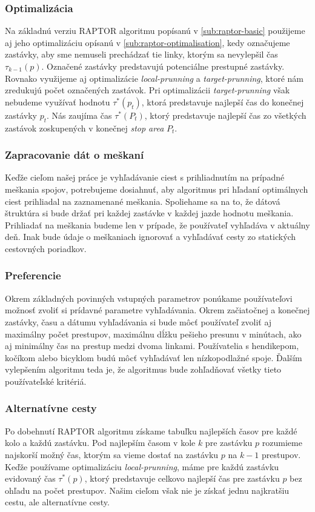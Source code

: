 \subsubsection{Optimalizácia}
Na základnú verziu RAPTOR algoritmu popísanú v \ref{sub:raptor-basic} použijeme aj jeho optimalizáciu opísanú v \ref{sub:raptor-optimalisation}, kedy označujeme zastávky, aby sme nemuseli prechádzať tie linky, ktorým sa nevylepšil čas $\tau_{k-1}(p)$. Označené zastávky predstavujú potenciálne prestupné zastávky.  Rovnako využijeme aj optimalizácie \textit{local-prunning} a \textit{target-prunning}, ktoré nám zredukujú počet označených zastávok. Pri optimalizácii \textit{target-prunning} však nebudeme využívať hodnotu $\tau^*(p_t)$, ktorá predstavuje najlepší čas do konečnej zastávky $p_t$. Nás zaujíma čas $\tau^*(P_t)$, ktorý predstavuje najlepší čas zo všetkých zastávok zoskupených v konečnej \textit{stop area} $P_t$. 

\subsubsection{Zapracovanie dát o meškaní}
Keďže cieľom našej práce je vyhľadávanie ciest s prihliadnutím na prípadné meškania spojov, potrebujeme dosiahnuť, aby algoritmus pri hľadaní optimálnych ciest prihliadal na zaznamenané meškania. Spoliehame sa na to, že dátová štruktúra si bude držať pri každej zastávke v každej jazde hodnotu meškania. Prihliadať na meškania budeme len v prípade, že používateľ vyhľadáva v aktuálny deň. Inak bude údaje o meškaniach ignorovať a vyhľadávať cesty zo statických cestovných poriadkov.

\subsubsection{Preferencie}
Okrem základných povinných vstupných parametrov ponúkame používateľovi možnosť zvoliť si prídavné parametre vyhľadávania. Okrem začiatočnej a konečnej zastávky, času a dátumu vyhľadávania si bude môcť používateľ zvoliť aj maximálny počet prestupov, maximálnu dĺžku pešieho presunu v minútach, ako aj minimálny čas na prestup medzi dvoma linkami. Používatelia s hendikepom, kočíkom alebo bicyklom budú môcť vyhľadávať len nízkopodlažné spoje. Ďalším vylepšením algoritmu teda je, že algoritmus bude zohľadňovať všetky tieto používateľské kritériá. 

\subsubsection{Alternatívne cesty}
Po dobehnutí RAPTOR algoritmu získame tabuľku najlepších časov pre každé kolo a každú zastávku. Pod najlepším časom v kole $k$ pre zastávku $p$ rozumieme najskorší možný čas, ktorým sa vieme dostať na zastávku $p$ na $k-1$ prestupov. Keďže používame optimalizáciu \textit{local-prunning}, máme pre každú zastávku evidovaný čas $\tau^*(p)$, ktorý predstavuje celkovo najlepší čas pre zastávku $p$ bez ohľadu na počet prestupov. Našim cieľom však nie je získať jednu najkratšiu cestu, ale alternatívne cesty.

